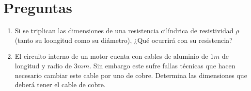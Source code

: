 \documentclass[../main.tex]{subfiles}
\begin{document}
\section{Preguntas}%
\label{sec:preguntas}

\thispagestyle{fancy}

\begin{enumerate}
	\item Si se triplican las dimensiones de una resistencia cilíndrica de
		resistividad $\rho$ (tanto su loongitud como su diámetro),
		¿Qué ocurrirá con su resistencia?
	\item El circuito interno de un motor cuenta con cables de aluminio de
		$1m$ de longitud y radio de $3mm$.
		Sin embargo este sufre fallas técnicas que hacen necesario cambiar este
		cable por uno de cobre.
		Determina las dimensiones que deberá tener el cable de cobre.
\end{enumerate}
\end{document}
